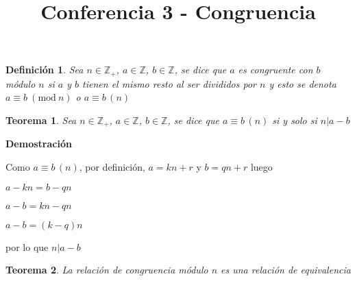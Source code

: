 \documentclass[a4paper,12pt]{report}
\title{Conferencia 3 - Congruencia}
\author{}
\newtheorem*{teo}{Teorema}
\newtheorem*{dfn}{Definición}
\begin{document}
\maketitle


\begin{dfn}
 Sea $n\in \mathbb{Z}_+$, $a\in \mathbb{Z}$, $b\in \mathbb{Z}$, se dice que $a$ es congruente con $b$ módulo $n$ si $a$ y $b$ tienen el mismo resto al ser divididos por $n$ y esto se denota $ a\equiv b \ (\textrm{mod}\ n)$ o $a\equiv b\, (n)$
\end{dfn}

\begin{teo}
 Sea $n\in \mathbb{Z}_+$, $a\in \mathbb{Z}$, $b\in \mathbb{Z}$, se dice que $a \equiv b \, (n)$ si y solo si $n|a-b$
\end{teo}

\textbf{Demostración}

Como $a\equiv b\, (n)$, por definición, $a=kn+r$ y $b=qn+r$  luego 

$a-kn=b-qn$ 

$a-b=kn-qn$

$a-b=(k-q)n$

por lo que $n|a-b$

\begin{teo}
 La relación de congruencia módulo $n$ es una relación de equivalencia
\end{teo}
\end{document}
